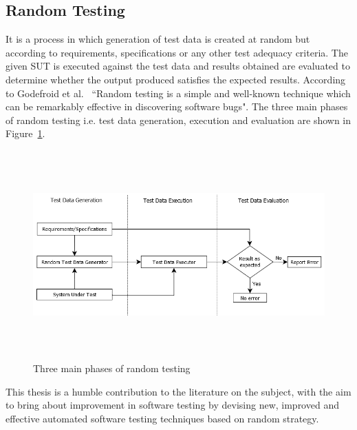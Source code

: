 \subsection{Random Testing} 
It is a process in which generation of test data is created at random but according to requirements, specifications or any other test adequacy criteria. The given SUT is executed against the test data and results obtained are evaluated to determine whether the output produced satisfies the expected results. According to Godefroid et al.~\cite{godefroid2005dart} ``Random testing is a simple and well-known technique which can be remarkably effective in discovering software bugs". The three main phases of random testing i.e. test data generation, execution and evaluation are shown in Figure~\ref{fig:SoftwareTesting1}.
\\
\begin{figure}[h]
	\centering
		\includegraphics[width=15.3cm, height=8cm ]{chapter1/SoftwareTesting1.png}
		\bigskip
		\caption{Three main phases of random testing}
	\label{fig:SoftwareTesting1}
\end{figure}

This thesis is a humble contribution to the literature on the subject, with the aim to bring about improvement in software testing by devising new, improved and effective automated software testing techniques based on random strategy.
\newpage
